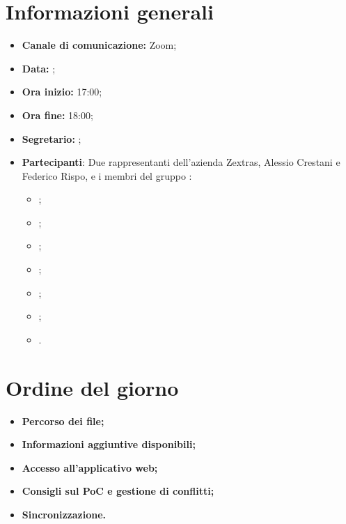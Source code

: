 \section{Informazioni generali}

\begin{itemize}

    \item \textbf{Canale di comunicazione:} Zoom;

    \item \textbf{Data:} \DataMeeting{};
    
    \item \textbf{Ora inizio:} 17:00;

    \item \textbf{Ora fine:} 18:00;

    \item \textbf{Segretario:} \ACapoRedazione{};

    \item \textbf{Partecipanti}: Due rappresentanti dell'azienda Zextras, Alessio Crestani e Federico Rispo,  e i membri del gruppo \Gruppo{}:
    
        \begin{itemize}
            \item \Daniele{};
            \item \Davide{};
            \item \Francesco{};
            \item \Giosue{};
            \item \Lucrezia{};
            \item \Matteo{};
             \item \Tommaso{}.
        \end{itemize}
\end{itemize}

\section{Ordine del giorno}

\begin{itemize}
    \item\textbf{Percorso dei file;}
    \item\textbf{Informazioni aggiuntive disponibili;}
    \item\textbf{Accesso all'applicativo web;}
     \item\textbf{Consigli sul PoC e gestione di conflitti;}
      \item\textbf{Sincronizzazione.}
\end{itemize}
\newpage


